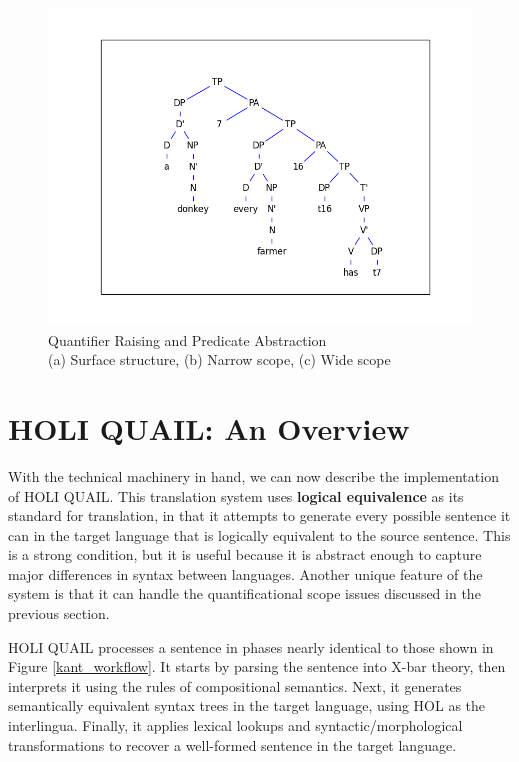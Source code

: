\documentclass[11pt, oneside]{article}      %
\begin{document}
\begin{figure} [ht]
\begin{minipage}[c]{0.5\linewidth}
\includegraphics[scale=.43]{donkey_eng_2_2.png}
\subcaption{}
\end{minipage}
\caption{Quantifier Raising and Predicate Abstraction \\ (a) Surface structure, (b) Narrow scope, (c) Wide scope} \label{QR}
\end{figure}

\section{HOLI QUAIL: An Overview}

With the technical machinery in hand, we can now describe the implementation of HOLI QUAIL.  This translation system uses \textbf{logical equivalence} as its standard for translation, in that it attempts to generate every possible sentence it can in the target language that is logically equivalent to the source sentence.  This is a strong condition, but it is useful because it is abstract enough to capture major differences in syntax between languages.  Another unique feature of the system is that it can handle the quantificational scope issues discussed in the previous section.

HOLI QUAIL processes a sentence in phases nearly identical to those shown in Figure \ref{kant_workflow}.  It starts by parsing the sentence into X-bar theory, then interprets it using the rules of compositional semantics.  Next, it generates semantically equivalent syntax trees in the target language, using HOL as the interlingua.  Finally, it applies lexical lookups and syntactic/morphological transformations to recover a well-formed sentence in the target language.  
\end{document}
